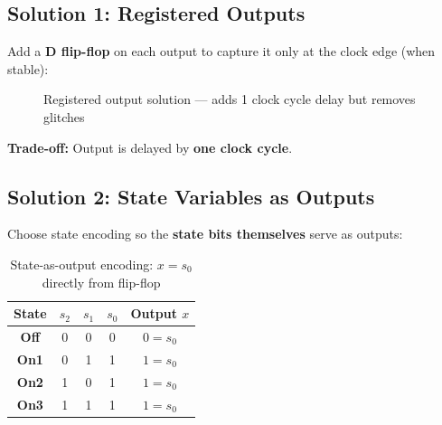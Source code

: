 \documentclass[12pt, a4paper]{article}
\begin{document}
\subsection{Solution 1: Registered Outputs}

Add a \textbf{D flip-flop} on each output to capture it only at the clock edge (when stable):

\begin{figure}[H]
\centering
{}
\caption{Registered output solution --- adds 1 clock cycle delay but removes glitches}
\end{figure}

\textbf{Trade-off:} Output is delayed by \textbf{one clock cycle}.

\subsection{Solution 2: State Variables as Outputs}

Choose state encoding so the \textbf{state bits themselves} serve as outputs:

\begin{table}[H]
\centering
\renewcommand{\arraystretch}{1.3}
\begin{tabular}{@{} >{\bfseries}c c c c c @{}}
  \toprule
  State & $s_2$ & $s_1$ & $s_0$ & Output $x$ \\
  \midrule
  Off & 0 & 0 & 0 & $0 = s_0$ \\
  On1 & 0 & 1 & 1 & $1 = s_0$ \\
  On2 & 1 & 0 & 1 & $1 = s_0$ \\
  On3 & 1 & 1 & 1 & $1 = s_0$ \\
  \bottomrule
\end{tabular}
\caption{State-as-output encoding: $x = s_0$ directly from flip-flop}
\end{table}
\end{document}
